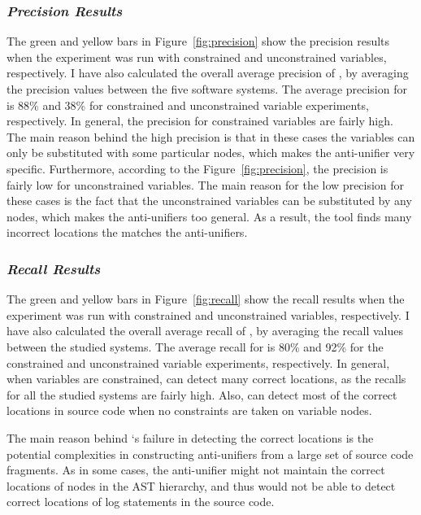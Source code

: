 \subsubsection{\emph{Precision Results}}  \label{precision-results}
The green and yellow bars in Figure~\ref{fig:precision}  show the precision results when the experiment was run with constrained and unconstrained variables, respectively. I have also calculated the overall average precision of , by averaging the precision values between the five software systems. The average precision for  is 88\% and 38\% for constrained and unconstrained variable experiments, respectively. In general, the precision for constrained variables are fairly high. The main reason behind the high precision is that in these cases the variables can only be substituted with some particular nodes, which makes the anti-unifier very specific. Furthermore, according to the Figure~\ref{fig:precision}, the precision is fairly low for unconstrained variables. The main reason for the low precision for these cases is the fact that the unconstrained variables can be substituted by any nodes, which makes the anti-unifiers too general. As a result, the tool finds many incorrect locations the matches the anti-unifiers. 
 
\subsubsection{\emph{Recall Results}}  \label{recall-results}
The green and yellow bars in Figure~\ref{fig:recall}  show the recall results when the experiment was run with constrained and unconstrained variables, respectively. I have also calculated the overall average recall of , by averaging the recall values between the studied systems. The average recall for  is 80\% and 92\% for the constrained and unconstrained variable experiments, respectively. In general, when variables are constrained,  can detect many correct locations, as the recalls for all the studied systems are fairly high. Also,  can detect most of the correct locations in source code when no constraints are taken on variable nodes. 

The main reason behind `s failure in detecting the correct locations is the potential complexities in constructing anti-unifiers from a large set of source code fragments. As in some cases, the anti-unifier might not maintain the correct locations of nodes in the AST hierarchy, and thus  would not be able to detect correct locations of log statements in the source code.  


